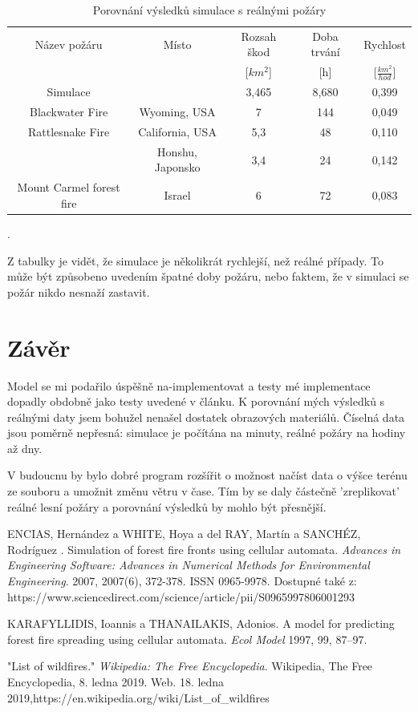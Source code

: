\documentclass[11pt,a4paper]{scrartcl}
\begin{document}
	\begin{table}
		\centering
		\begin{tabular}{|c|c|c|c|c|}
			\hline
			Název požáru & Místo & Rozsah škod & Doba trvání & Rychlost \\
			&& [$km^2$] & [h] & [$\frac{km^2}{hod}$] \\
			\hline
			Simulace & & 3,465 & 8,680 & 0,399 \\
			\hline
			Blackwater Fire & Wyoming, USA & 7 & 144 & 0,049 \\
			\hline
			Rattlesnake Fire & California, USA & 5,3 & 48 & 0,110 \\
			\hline
			& Honshu, Japonsko & 3,4 & 24 & 0,142 \\
			\hline
			Mount Carmel forest fire & Israel & 6 & 72 & 0,083 \\
			\hline
		\end{tabular}
		\caption{Porovnání výsledků simulace s reálnými požáry}
		\label{tab:real-compare}.
	\end{table}

	Z tabulky je vidět, že simulace je několikrát rychlejší, než reálné případy. To může být způsobeno uvedením špatné doby požáru, nebo faktem, že v simulaci se požár nikdo nesnaží zastavit.

	\section{Závěr}
	Model se mi podařilo úspěšně na-implementovat a testy mé implementace dopadly obdobně jako testy uvedené v článku. K porovnání mých výsledků s reálnými daty jsem bohužel nenašel dostatek obrazových materiálů. Číselná data jsou poměrně nepřesná: simulace je počítána na minuty, reálné požáry na hodiny až dny.
	
	V budoucnu by bylo dobré program rozšířit o možnost načíst data o výšce terénu ze souboru a umožnit změnu větru v čase. Tím by se daly částečně 'zreplikovat' reálné lesní požáry a porovnání výsledků by mohlo být přesnější.
	
	\begin{thebibliography}{9}
		
		ENCIAS, Hernández a WHITE, Hoya a del RAY, Martín a SANCHÉZ, Rodríguez . Simulation of forest fire fronts using cellular automata. \textit{Advances in Engineering Software: Advances in Numerical Methods for Environmental Engineering}. 2007, 2007(6), 372-378. ISSN 0965-9978. Dostupné také z: https://www.sciencedirect.com/science/article/pii/S0965997806001293
		
		KARAFYLLIDIS, Ioannis a THANAILAKIS, Adonios. A model for predicting forest fire spreading using cellular automata. \textit{Ecol Model} 1997, 99, 87–97.
		
		"List of wildfires." \textit{Wikipedia: The Free Encyclopedia}. Wikipedia, The Free Encyclopedia, 8. ledna 2019. Web. 18. ledna 2019,https://en.wikipedia.org/wiki/List\_of\_wildfires
	\end{thebibliography}
	
\end{document}
